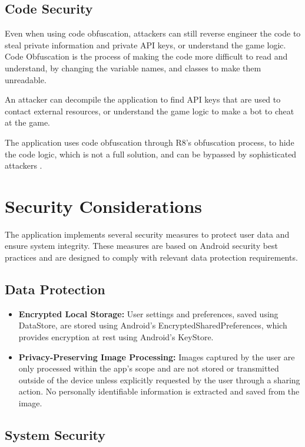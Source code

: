 \subsection{Code Security}

Even when using code obfuscation, attackers can still reverse engineer the code to steal private information and private API keys, or understand the game logic. Code Obfuscation is the process of making the code more difficult to read and understand, by changing the variable names, and classes to make them unreadable.

An attacker can decompile the application to find API keys that are used to contact external resources, or understand the game logic to make a bot to cheat at the game.

The application uses code obfuscation through R8's obfuscation process, to hide the code logic, which is not a full solution, and can be bypassed by sophisticated attackers \cite{bib:android_obfuscation}.

\section{Security Considerations}

The application implements several security measures to protect user data and ensure system integrity. These measures are based on Android security best practices and are designed to comply with relevant data protection requirements.

\subsection{Data Protection}

\begin{itemize}
    \item \textbf{Encrypted Local Storage:} User settings and preferences, saved using DataStore, are stored using Android's EncryptedSharedPreferences, which provides encryption at rest using Android's KeyStore.
    \item \textbf{Privacy-Preserving Image Processing:} Images captured by the user are only processed within the app's scope and are not stored or transmitted outside of the device unless explicitly requested by the user through a sharing action. No personally identifiable information is extracted and saved from the image.
\end{itemize}

\subsection{System Security}

